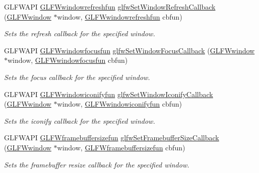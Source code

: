 \begin{CompactItemize}
GLFWAPI \hyperlink{group__window_g16764f89bf2060e6fa477f0943e1412b}{GLFWwindowrefreshfun} \hyperlink{group__window_g9d2621fbc271a0cdc0ce91f9749f46e3}{glfwSetWindowRefreshCallback} (\hyperlink{group__window_g3c96d80d363e67d13a41b5d1821f3242}{GLFWwindow} $\ast$window, \hyperlink{group__window_g16764f89bf2060e6fa477f0943e1412b}{GLFWwindowrefreshfun} cbfun)
\begin{CompactList}\small\item\em Sets the refresh callback for the specified window. \item\end{CompactList}\item 
GLFWAPI \hyperlink{group__window_g6b5f973531ea91663ad707ba4f2ac104}{GLFWwindowfocusfun} \hyperlink{group__window_gc89c6534ba7fbab6f6c68b855656c0d4}{glfwSetWindowFocusCallback} (\hyperlink{group__window_g3c96d80d363e67d13a41b5d1821f3242}{GLFWwindow} $\ast$window, \hyperlink{group__window_g6b5f973531ea91663ad707ba4f2ac104}{GLFWwindowfocusfun} cbfun)
\begin{CompactList}\small\item\em Sets the focus callback for the specified window. \item\end{CompactList}\item 
GLFWAPI \hyperlink{group__window_ge47ae066eea9fe6050a62360928ae524}{GLFWwindowiconifyfun} \hyperlink{group__window_g17cd86946117b56c76397530900519db}{glfwSetWindowIconifyCallback} (\hyperlink{group__window_g3c96d80d363e67d13a41b5d1821f3242}{GLFWwindow} $\ast$window, \hyperlink{group__window_ge47ae066eea9fe6050a62360928ae524}{GLFWwindowiconifyfun} cbfun)
\begin{CompactList}\small\item\em Sets the iconify callback for the specified window. \item\end{CompactList}\item 
GLFWAPI \hyperlink{group__window_g311bb32e578aa240b6464af494debffc}{GLFWframebuffersizefun} \hyperlink{group__window_gd766bcdb4465f9c6c62e5d8ca7cfba56}{glfwSetFramebufferSizeCallback} (\hyperlink{group__window_g3c96d80d363e67d13a41b5d1821f3242}{GLFWwindow} $\ast$window, \hyperlink{group__window_g311bb32e578aa240b6464af494debffc}{GLFWframebuffersizefun} cbfun)
\begin{CompactList}\small\item\em Sets the framebuffer resize callback for the specified window. \item\end{CompactList}\item 

\end{CompactItemize}
